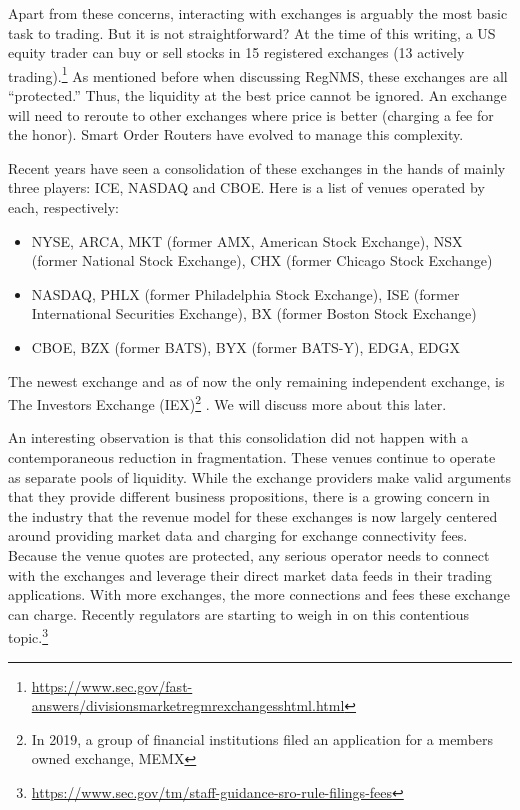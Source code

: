 Apart from these concerns, interacting with exchanges is arguably the most basic task to trading. But it is not straightforward? At the time of this writing, a US equity trader can buy or sell stocks in 15 registered exchanges (13 actively trading).\footnote{\url{https://www.sec.gov/fast-answers/divisionsmarketregmrexchangesshtml.html}} As mentioned before when discussing RegNMS, these exchanges are all ``protected.'' Thus, the liquidity at the best price cannot be ignored. An exchange will need to reroute to other exchanges where price is better (charging a fee for the honor). Smart Order Routers have evolved to manage this complexity.


Recent years have seen a consolidation of these exchanges in the hands of mainly three players: ICE, NASDAQ and CBOE. Here is a list of venues operated by each, respectively:
        \begin{itemize}
        \item NYSE, ARCA, MKT (former AMX, American Stock Exchange), NSX (former National Stock Exchange), CHX (former Chicago Stock Exchange)
        \item NASDAQ, PHLX (former Philadelphia Stock Exchange), ISE (former International Securities Exchange), BX (former Boston Stock Exchange)
        \item CBOE, BZX (former BATS), BYX (former BATS-Y), EDGA, EDGX
        \end{itemize}
The newest exchange and as of now the only remaining independent exchange, is The Investors Exchange (IEX)\footnote{In 2019, a group of financial institutions filed an application for a members owned exchange, MEMX} . We will discuss more about this later.


An interesting observation is that this consolidation did not happen with a contemporaneous reduction in fragmentation. These venues continue to operate as separate pools of liquidity. While the exchange providers make valid arguments that they provide different business propositions, there is a growing concern in the industry that the revenue model for these exchanges is now largely centered around providing market data and charging for exchange connectivity fees. Because the venue quotes are protected, any serious operator needs to connect with the exchanges and leverage their direct market data feeds in their trading applications. With more exchanges, the more connections and fees these exchange can charge. Recently regulators are starting to weigh in on this contentious topic.\footnote{\url{https://www.sec.gov/tm/staff-guidance-sro-rule-filings-fees}}


